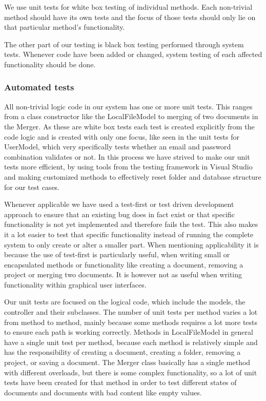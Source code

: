 We use unit tests for white box testing of individual methods. Each non-trivial method should have its own tests and the focus of those tests should only lie on that particular method's functionality.

The other part of our testing is black box testing performed through system tests. Whenever code have been added or changed, system testing of each affected functionality should be done.

\subsubsection{Automated tests}
All non-trivial logic code in our system has one or more unit tests. This ranges from a class constructor like the LocalFileModel to merging of two documents in the Merger. As these are white box tests each test is created explicitly from the code logic and is created with only one focus, like seen in the unit tests for UserModel, which very specifically tests whether an email and password combination validates or not. In this process we have strived to make our unit tests more efficient, by using tools from the testing framework in Visual Studio and making customized methods to effectively reset folder and database structure for our test cases.

Whenever applicable we have used a test-first or test driven development approach to ensure that an existing bug does in fact exist or that specific functionality is not yet implemented and therefore fails the test. This also makes it a lot easier to test that specific functionality instead of running the complete system to only create or alter a smaller part. When mentioning applicability it is because the use of test-first is particularly useful, when writing small  or encapsulated methods or functionality like creating a document, removing a project or merging two documents. It is however not as useful when writing functionality within graphical user interfaces.

Our unit tests are focused on the logical code, which include the models, the controller and their subclasses. The number of unit tests per method varies a lot from method to method, mainly because some methods requires a lot more tests to ensure each path is working correctly. Methods in LocalFileModel in general have a single unit test per method, because each method is relatively simple and has the responsibility of creating a document, creating a folder, removing a project, or saving a document. The Merger class basically has a single method with different overloads, but there is some complex functionality, so a lot of unit tests have been created for that method in order to test different states of documents and documents with bad content like empty values.

